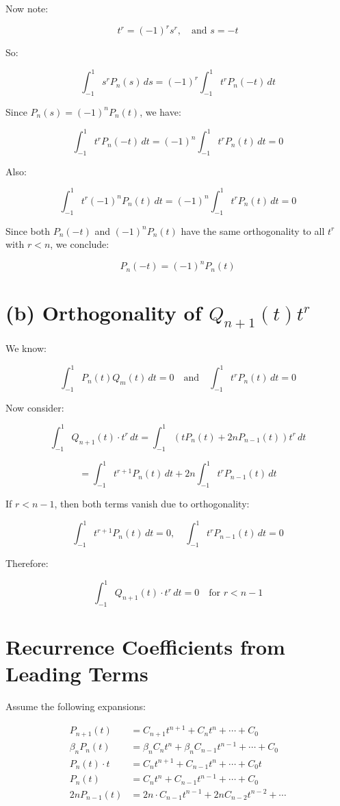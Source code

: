 \documentclass{article}
\begin{document}
Now note:

\[
t^r = (-1)^r s^r, \quad \text{and } s = -t
\]

So:

\[
\int_{-1}^{1} s^r P_n(s) \, ds = (-1)^r \int_{-1}^{1} t^r P_n(-t) \, dt
\]

Since \( P_n(s) = (-1)^n P_n(t) \), we have:

\[
\int_{-1}^{1} t^r P_n(-t) \, dt = (-1)^n \int_{-1}^{1} t^r P_n(t) \, dt = 0
\]

Also:

\[
\int_{-1}^{1} t^r (-1)^n P_n(t) \, dt = (-1)^n \int_{-1}^{1} t^r P_n(t) \, dt = 0
\]

Since both \( P_n(-t) \) and \( (-1)^n P_n(t) \) have the same orthogonality to all \( t^r \) with \( r < n \), we conclude:

\[
\boxed{P_n(-t) = (-1)^n P_n(t)}
\]

\section*{(b) Orthogonality of $Q_{n+1}(t) t^r$}

We know:

\[
\int_{-1}^{1} P_n(t) Q_m(t) \, dt = 0
\quad \text{and} \quad
\int_{-1}^{1} t^r P_n(t) \, dt = 0
\]

Now consider:

\[
\int_{-1}^{1} Q_{n+1}(t) \cdot t^r \, dt
= \int_{-1}^{1} \left( t P_n(t) + 2n P_{n-1}(t) \right) t^r \, dt
\]

\[
= \int_{-1}^{1} t^{r+1} P_n(t) \, dt + 2n \int_{-1}^{1} t^r P_{n-1}(t) \, dt
\]

If \( r < n-1 \), then both terms vanish due to orthogonality:

\[
\int_{-1}^{1} t^{r+1} P_n(t) \, dt = 0,
\quad
\int_{-1}^{1} t^r P_{n-1}(t) \, dt = 0
\]

Therefore:

\[
\boxed{
\int_{-1}^{1} Q_{n+1}(t) \cdot t^r \, dt = 0 \quad \text{for } r < n - 1
}
\]

\section*{Recurrence Coefficients from Leading Terms}

Assume the following expansions:

\begin{align*}
P_{n+1}(t) &= C_{n+1} t^{n+1} + C_n t^n + \cdots + C_0 \\
\beta_n P_n(t) &= \beta_n C_n t^n + \beta_n C_{n-1} t^{n-1} + \cdots + C_0 \\
P_n(t) \cdot t &= C_n t^{n+1} + C_{n-1} t^n + \cdots + C_0 t \\
P_n(t) &= C_n t^n + C_{n-1} t^{n-1} + \cdots + C_0 \\
2n P_{n-1}(t) &= 2n \cdot C_{n-1} t^{n-1} + 2n C_{n-2} t^{n-2} + \cdots
\end{align*}
\end{document}
